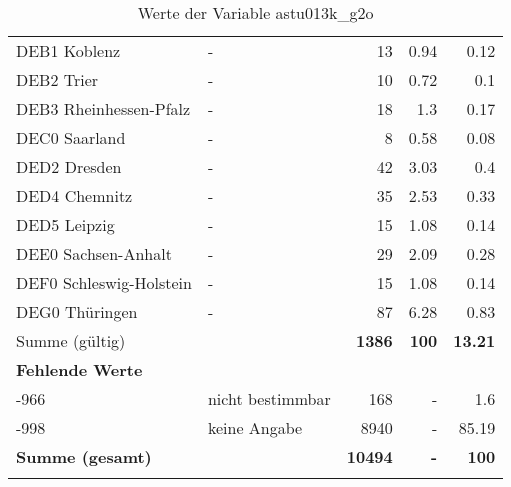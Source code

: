 \begin{longtable}{Xlrrr}
        \multicolumn{1}{X}{DEB1 Koblenz} & - & \num{13} & \num[round-mode=places,round-precision=2]{0.94} & \num[round-mode=places,round-precision=2]{0.12} \\
        \multicolumn{1}{X}{DEB2 Trier} & - & \num{10} & \num[round-mode=places,round-precision=2]{0.72} & \num[round-mode=places,round-precision=2]{0.1} \\
        \multicolumn{1}{X}{DEB3 Rheinhessen-Pfalz} & - & \num{18} & \num[round-mode=places,round-precision=2]{1.3} & \num[round-mode=places,round-precision=2]{0.17} \\
        \multicolumn{1}{X}{DEC0 Saarland} & - & \num{8} & \num[round-mode=places,round-precision=2]{0.58} & \num[round-mode=places,round-precision=2]{0.08} \\
        \multicolumn{1}{X}{DED2 Dresden} & - & \num{42} & \num[round-mode=places,round-precision=2]{3.03} & \num[round-mode=places,round-precision=2]{0.4} \\
        \multicolumn{1}{X}{DED4 Chemnitz} & - & \num{35} & \num[round-mode=places,round-precision=2]{2.53} & \num[round-mode=places,round-precision=2]{0.33} \\
        \multicolumn{1}{X}{DED5 Leipzig} & - & \num{15} & \num[round-mode=places,round-precision=2]{1.08} & \num[round-mode=places,round-precision=2]{0.14} \\
        \multicolumn{1}{X}{DEE0 Sachsen-Anhalt} & - & \num{29} & \num[round-mode=places,round-precision=2]{2.09} & \num[round-mode=places,round-precision=2]{0.28} \\
        \multicolumn{1}{X}{DEF0 Schleswig-Holstein} & - & \num{15} & \num[round-mode=places,round-precision=2]{1.08} & \num[round-mode=places,round-precision=2]{0.14} \\
        \multicolumn{1}{X}{DEG0 Thüringen} & - & \num{87} & \num[round-mode=places,round-precision=2]{6.28} & \num[round-mode=places,round-precision=2]{0.83} \\
     \midrule
      \multicolumn{2}{l}{Summe (gültig)} & \textbf{\num{1386}} &
      \textbf{\num{100}} &
         \textbf{\num[round-mode=places,round-precision=2]{13.21}} \\
     \multicolumn{5}{l}{\textbf{Fehlende Werte}}\\
       -966 & nicht bestimmbar & \num{168} & - & \num[round-mode=places,round-precision=2]{1.6} \\

       -998 & keine Angabe & \num{8940} & - & \num[round-mode=places,round-precision=2]{85.19} \\

     \midrule
     \multicolumn{2}{l}{\textbf{Summe (gesamt)}} & \textbf{\num{10494}} & \textbf{-} & \textbf{\num{100}} \\
     \bottomrule
     \caption{Werte der Variable astu013k\_g2o}
     \end{longtable}
     

